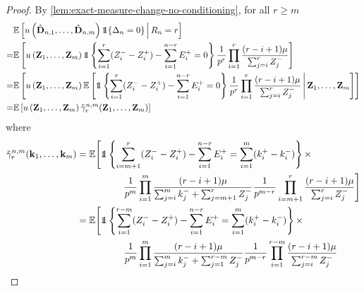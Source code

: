 \begin{proof}
    By \cref{lem:exact-measure-change-no-conditioning}, for all $r \geq m$
    \begin{align*}
        &\E \left[ 
            u\left( 
                \hat{\vD}_{n, 1}, \ldots, \hat{\vD}_{n, m}
             \right)
            \one\{\Delta_n = 0\}
            \, \middle\vert \,
            R_n = r
         \right] \\
        =&\E \left[ 
            u\left( \vZ_1, \ldots, \vZ_m \right)
            \one \left\{ 
                \sum_{i=1}^r (Z_i^- - Z_i^+) - \sum_{i=1}^{n-r} E_i^+ = 0
             \right\}
             \frac{1}{p^r} \prod_{i=1}^r \frac{(r - i + 1) \mu}{\sum_{j=i}^r Z_j^-}
         \right] \\
        =&\E \left[ 
            u\left( \vZ_1, \ldots, \vZ_m \right)
            \E \left[ 
                \one \left\{ 
                    \sum_{i=1}^r (Z_i^- - Z_i^+) - \sum_{i=1}^{n-r} E_i^+ = 0
                \right\}
                \frac{1}{p^r} \prod_{i=1}^r \frac{(r - i + 1) \mu}{\sum_{j=i}^r Z_j^-}
                \, \middle \lvert \,
                \vZ_1, \ldots, \vZ_m
             \right]
         \right] \\
        =&\E \left[ 
            u\left( \vZ_1, \ldots, \vZ_m \right)
            \tilde{\gamma}^{n, m}_r (\vZ_1, \ldots, \vZ_m)
         \right]
    \end{align*}
    where
    \begin{align*}
        \tilde{\gamma}^{n, m}_r (\vk_1, \ldots, \vk_m)
        &= \E \Bigg[ 
            \one \left\{ 
                \sum_{i=m+1}^r (Z_i^- - Z_i^+) - \sum_{i=1}^{n-r} E_i^+ = \sum_{i=1}^m (k_i^+ - k_i^-)
            \right\} \times \\
            &\hspace{5em}
            \frac{1}{p^m} \prod_{i=1}^m \frac{(r - i + 1) \mu}{\sum_{j=i}^m k_j^- + \sum_{j=m+1}^r Z_j^-}
            \frac{1}{p^{m-r}} \prod_{i=m+1}^r \frac{(r - i + 1) \mu}{\sum_{j=i}^r Z_j^-}
        \Bigg] \\
        &= \E \Bigg[ 
            \one \left\{ 
                \sum_{i=1}^{r-m} (Z_i^- - Z_i^+) - \sum_{i=1}^{n-r} E_i^+ = \sum_{i=1}^m (k_i^+ - k_i^-)
            \right\} \times \\
            &\hspace{5em}
            \frac{1}{p^m} \prod_{i=1}^m \frac{(r - i + 1) \mu}{\sum_{j=i}^m k_j^- + \sum_{j=1}^{r-m} Z_j^-}
            \frac{1}{p^{m-r}} \prod_{i=1}^{r-m} \frac{(r - i + 1) \mu}{\sum_{j=i}^{r-m} Z_j^-}

\end{align*}
\end{proof}
